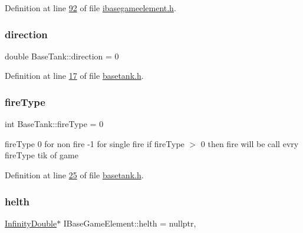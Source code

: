 Definition at line \hyperlink{a00047_source_l00092}{92} of file \hyperlink{a00047_source}{ibasegameelement.\+h}.

\mbox{\label{a00157_a647e1404ae554cb46d9168f988e05e9e}} 
\subsubsection{\texorpdfstring{direction}{direction}}
{\footnotesize\ttfamily double Base\+Tank\+::direction = 0\hspace{0.3cm}{\ttfamily [protected]}}



Definition at line \hyperlink{a00041_source_l00017}{17} of file \hyperlink{a00041_source}{basetank.\+h}.

\mbox{\label{a00157_a927e84e94d984793d55d0048b123ae15}} 
\subsubsection{\texorpdfstring{fire\+Type}{fireType}}
{\footnotesize\ttfamily int Base\+Tank\+::fire\+Type = 0\hspace{0.3cm}{\ttfamily [protected]}}



fire\+Type 0 for non fire -\/1 for single fire if fire\+Type $>$ 0 then fire will be call evry fire\+Type tik of game 



Definition at line \hyperlink{a00041_source_l00025}{25} of file \hyperlink{a00041_source}{basetank.\+h}.

\mbox{\label{a00137_a440cf9e7d61c33482ab256a6e944b34d}} 
\subsubsection{\texorpdfstring{helth}{helth}}
{\footnotesize\ttfamily \hyperlink{a00161}{Infinity\+Double}$\ast$ I\+Base\+Game\+Element\+::helth = nullptr\hspace{0.3cm}{\ttfamily [protected]}, {\ttfamily [inherited]}}



